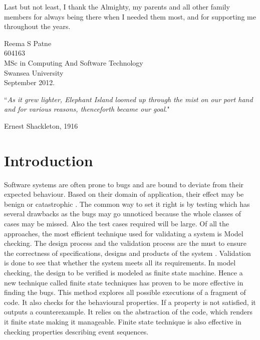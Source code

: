 \documentclass[a4paper,12pt]{report}
\begin{document}
 Last but not least, I thank the Almighty, my parents and all other family members for always being there when I needed them most, and for supporting me throughout the years.
\begin{flushright}
Reema S Patne\\
604163\\
MSc in Computing And Software Technology\\
Swansea University\\
September 2012.
\end{flushright}
 \clearpage
``\textit{As it grew lighter, Elephant Island loomed up through the mist on our port hand
and for various reasons, thenceforth became our goal}."
\begin{flushright}
Ernest Shackleton, 1916
\end{flushright}

\tableofcontents

\chapter{Introduction}
\label{Intro}

Software systems are often prone to bugs and are bound to deviate from their expected behaviour. Based on their domain of application, their effect may be benign or catastrophic \cite{Jackson2000}. The common way to set it right is by testing which has several drawbacks as the bugs may go unnoticed because the whole classes of cases may be missed. Also the test cases required will be large. Of all the approaches, the most efficient technique used for validating a system is Model checking. The design process and the validation process are the must to ensure the correctness of specifications, designs and products of the system \cite{ErichGamma1995}. Validation is done to see that whether the system meets all its requirements. In model checking, the design to be verified is modeled as finite state machine. Hence a new technique called finite state techniques has proven to be more effective in finding the bugs. This method explores all possible executions of a fragment of code. It also checks for the behavioural properties. If a property is not satisfied, it outputs a counterexample. It relies on the abstraction of the code, which renders it finite state making it manageable. Finite state technique is also effective in checking properties describing event sequences\cite{Vaziri-Farahani2004}. 
\end{document}

